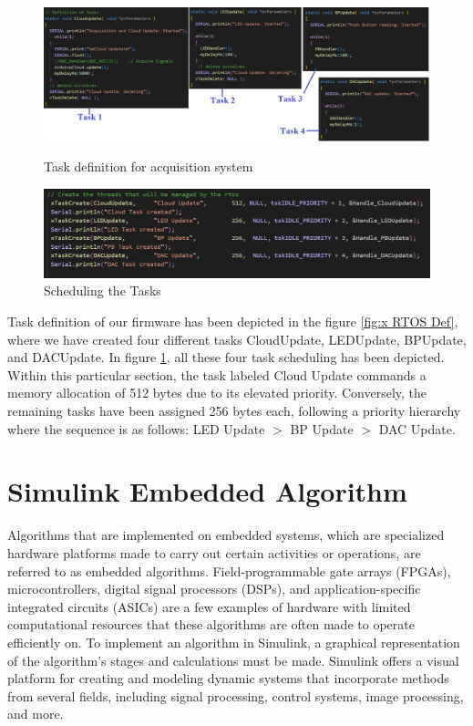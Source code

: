 \begin{figure}[htbp]
\centering
\includegraphics[scale=0.45]{images/Task1.png}
\caption{Task definition for acquisition system}
\label{fig:x RTOS Def}
\includegraphics[scale=0.65]{images/RTOS_task.png} 
\caption{Scheduling the Tasks}
\label{fig:x RTOS Task}
\end{figure}
Task definition of our firmware has been depicted in the figure \ref{fig:x RTOS Def}, where we have created four different tasks CloudUpdate, LEDUpdate, BPUpdate, and DACUpdate. In figure \ref{fig:x RTOS Task}, all these four task scheduling has been depicted. Within this particular section, the task labeled Cloud Update commands a memory allocation of 512 bytes due to its elevated priority. Conversely, the remaining tasks have been assigned 256 bytes each, following a priority hierarchy where the sequence is as follows: LED Update $>$ BP Update $>$ DAC Update.


\section{Simulink Embedded Algorithm} 
Algorithms that are implemented on embedded systems, which are specialized hardware platforms made to carry out certain activities or operations, are referred to as embedded algorithms. Field-programmable gate arrays (FPGAs), microcontrollers, digital signal processors (DSPs), and application-specific integrated circuits (ASICs) are a few examples of hardware with limited computational resources that these algorithms are often made to operate efficiently on. To implement an algorithm in Simulink, a graphical representation of the algorithm's stages and calculations must be made. Simulink offers a visual platform for creating and modeling dynamic systems that incorporate methods from several fields, including signal processing, control systems, image processing, and more. 

